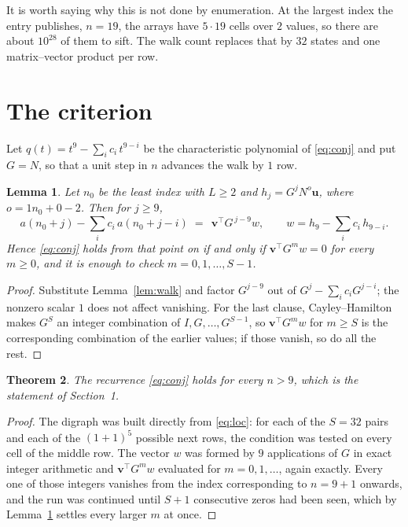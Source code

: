 \documentclass[11pt,a4paper]{article}
\theoremstyle{plain}
\newtheorem{theorem}{Theorem}
\newtheorem{lemma}[theorem]{Lemma}
\theoremstyle{definition}
\begin{document}
It is worth saying why this is not done by enumeration. At the largest index the entry
publishes, $n=19$, the arrays have $5\cdot19$ cells over
$2$ values, so there are about $10^{28}$ of them to sift. The
walk count replaces that by $32$ states and one matrix--vector product per row.
\section{The criterion}

Let $q(t)=t^{9}-\sum_i c_i\,t^{9-i}$ be the characteristic polynomial of
\eqref{eq:conj} and put $G=N$, so that a unit step in $n$ advances the walk by
$1$ row.

\begin{lemma}\label{lem:crit}
Let $n_0$ be the least index with $L\ge2$ and $h_j=G^{j}N^{o}\mathbf{u}$, where
$o=1n_0+0-2$. Then for $j\ge9$,
\[
a(n_0+j)-\sum_i c_i\,a(n_0+j-i)\;=\;\,\mathbf{v}^{\!\top}G^{\,j-9}w,
\qquad w=h_{9}-\sum_i c_i\,h_{9-i} .
\]
Hence \eqref{eq:conj} holds from that point on if and only if
$\mathbf{v}^{\!\top}G^{m}w=0$ for every $m\ge0$, and it is enough to check
$m=0,1,\dots,S-1$.
\end{lemma}

\begin{proof}
Substitute Lemma~\ref{lem:walk} and factor $G^{j-9}$ out of
$G^{j}-\sum_ic_iG^{j-i}$; the nonzero scalar $1$ does not affect
vanishing. For the last clause, Cayley--Hamilton makes $G^{S}$ an integer combination of
$I,G,\dots,G^{S-1}$, so $\mathbf{v}^{\!\top}G^{m}w$ for $m\ge S$ is the corresponding
combination of the earlier values; if those vanish, so do all the rest.
\end{proof}

\begin{theorem}
The recurrence \eqref{eq:conj} holds for every $n>9$, which is the statement of
Section~1.
\end{theorem}

\begin{proof}
The digraph was built directly from \eqref{eq:loc}: for each of the $S=32$ pairs and each
of the $(1+1)^{5}$ possible next rows, the condition was tested on every cell of
the middle row. The vector $w$ was formed by $9$ applications of $G$ in exact integer
arithmetic and $\mathbf{v}^{\!\top}G^{m}w$ evaluated for $m=0,1,\dots$, again exactly.
Every one of those integers vanishes from the index corresponding to $n=9+1$ onwards,
and the run was continued until $S+1$ consecutive zeros had been seen, which by
Lemma~\ref{lem:crit} settles every larger $m$ at once.
\end{proof}
\end{document}
